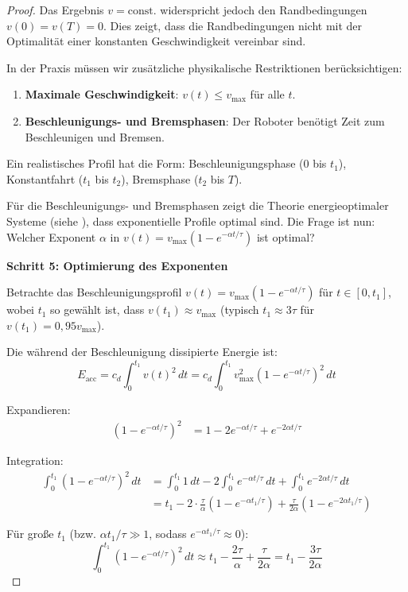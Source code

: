 ﻿\documentclass[a4paper,12pt]{article}
\theoremstyle{definition}
\begin{document}
\begin{proof}
Das Ergebnis $v = \text{const.}$ widerspricht jedoch den Randbedingungen $v(0) = v(T) = 0$. Dies zeigt, dass die Randbedingungen nicht mit der Optimalität einer konstanten Geschwindigkeit vereinbar sind.

In der Praxis müssen wir zusätzliche physikalische Restriktionen berücksichtigen:
\begin{enumerate}
\item \textbf{Maximale Geschwindigkeit}: $v(t) \leq v_{\max}$ für alle $t$.
\item \textbf{Beschleunigungs- und Bremsphasen}: Der Roboter benötigt Zeit zum Beschleunigen und Bremsen.
\end{enumerate}

Ein realistisches Profil hat die Form: Beschleunigungsphase (0 bis $t_1$), Konstantfahrt ($t_1$ bis $t_2$), Bremsphase ($t_2$ bis $T$).

Für die Beschleunigungs- und Bremsphasen zeigt die Theorie energieoptimaler Systeme (siehe \cite{phi_energy}), dass exponentielle Profile optimal sind. Die Frage ist nun: Welcher Exponent $\alpha$ in $v(t) = v_{\max}(1 - e^{-\alpha t/\tau})$ ist optimal?

\textbf{Schritt 5: Optimierung des Exponenten}

Betrachte das Beschleunigungsprofil $v(t) = v_{\max}(1 - e^{-\alpha t/\tau})$ für $t \in [0, t_1]$, wobei $t_1$ so gewählt ist, dass $v(t_1) \approx v_{\max}$ (typisch $t_1 \approx 3\tau$ für $v(t_1) = 0{,}95 v_{\max}$).

Die während der Beschleunigung dissipierte Energie ist:
\begin{equation}
E_{\text{acc}} = c_d \int_0^{t_1} v(t)^2 \, dt = c_d \int_0^{t_1} v_{\max}^2 (1 - e^{-\alpha t/\tau})^2 \, dt
\end{equation}

Expandieren:
\begin{align}
(1 - e^{-\alpha t/\tau})^2 &= 1 - 2e^{-\alpha t/\tau} + e^{-2\alpha t/\tau}
\end{align}

Integration:
\begin{align}
\int_0^{t_1} (1 - e^{-\alpha t/\tau})^2 \, dt &= \int_0^{t_1} 1 \, dt - 2\int_0^{t_1} e^{-\alpha t/\tau} \, dt + \int_0^{t_1} e^{-2\alpha t/\tau} \, dt \\
&= t_1 - 2 \cdot \frac{\tau}{\alpha}(1 - e^{-\alpha t_1/\tau}) + \frac{\tau}{2\alpha}(1 - e^{-2\alpha t_1/\tau})
\end{align}

Für große $t_1$ (bzw. $\alpha t_1/\tau \gg 1$, sodass $e^{-\alpha t_1/\tau} \approx 0$):
\begin{equation}
\int_0^{t_1} (1 - e^{-\alpha t/\tau})^2 \, dt \approx t_1 - \frac{2\tau}{\alpha} + \frac{\tau}{2\alpha} = t_1 - \frac{3\tau}{2\alpha}
\end{equation}


\end{proof}
\end{document}
